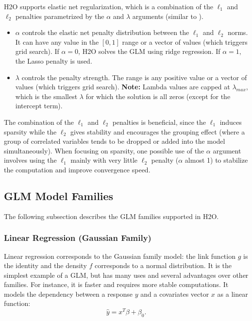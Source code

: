 H2O supports elastic net regularization, which is a combination of the $\ell_1$ and $\ell_2$ penalties parametrized by the $\alpha$ and $\lambda$ arguments (similar to ).
\begin{itemize}
\item $\alpha$ controls the elastic net penalty distribution between the $\ell_1$ and $\ell_2$ norms. It can have any value
in the $[0,1]$ range or a vector of values (which triggers grid search). If $\alpha = 0$, H2O solves the GLM using ridge regression. If $\alpha = 1$, the Lasso penalty is used. \nowidow[3]
\item $\lambda$ controls the penalty strength. The range is any positive value or a vector of values (which triggers grid search). 
\textbf{Note:} Lambda values are capped at $\lambda_{max}$, which is the smallest $\lambda$ for which the solution is
all zeros (except for the intercept term). %
\end{itemize}

The combination of the $\ell_1$ and $\ell_2$ penalties is beneficial, since the $\ell_1$ induces sparsity while the $\ell_2$ gives
stability and encourages the grouping effect (where a group of correlated variables tends to be dropped or added
into the model simultaneously). When focusing on sparsity, one possible use of the $\alpha$ argument  involves using the $\ell_1$ mainly with very little $\ell_2$ penalty
($\alpha$ almost 1) to stabilize the computation and improve convergence speed.


\subsection{GLM Model Families}
The following subsection describes the GLM families supported in H2O. 

\subsubsection{Linear Regression (Gaussian Family)}
Linear regression corresponds to the Gaussian family model: the link function $g$ is the identity and the density $f$ corresponds to a normal distribution. It is the simplest example of a GLM, but has many uses and
several advantages over other families. For instance, it is faster and requires more stable computations. It models the dependency between a response $y$ and a covariates vector $x$ as a linear function:
$$ \hat{y} = x^T\beta + \beta_0.$$

